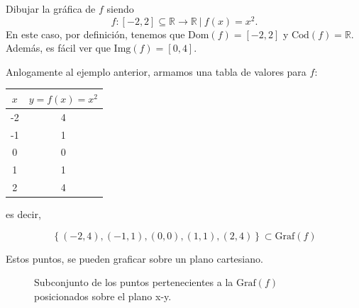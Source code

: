 \begin{example} Dibujar la gr\'afica de $f$ siendo $$f: [-2,2]  \subseteq \mathbb{R} \rightarrow  \mathbb{R} \:|\:  f(x)=x^2.$$    En este caso, por definici\'on,  tenemos que $\text{Dom}(f)=  [-2,2]$ y $\text{Cod}(f)=  \mathbb{R}$. Adem\'as, es f\'acil ver que $\text{Img}(f)= [0,4].$

Anlogamente al ejemplo anterior,  armamos una tabla de valores para $f$:
    \begin{table}[H]
        \centering
        \begin{tabular}{|c|c|}
            \hline
            $x$ & $y=f(x)=x^2$ \\ \hline
            -2  & 4        \\ \hline
            -1  & 1        \\ \hline
            0   & 0        \\ \hline
            1   & 1        \\ \hline
            2   & 4        \\ \hline
            \end{tabular}
      \end{table} es decir, 
     
    \begin{equation*}
        \left\{ (-2,4),(-1,1),(0,0),(1,1),(2,4) \right\}\subset \text{Graf}(f)
    \end{equation*}
 
 Estos puntos, se pueden graficar sobre un plano cartesiano.

\begin{figure}[H] 
        \begin{center}
        \end{center}
        \caption{Subconjunto de los puntos pertenecientes a la $\text{Graf}(f)$ posicionados sobre el plano x-y.}
\end{figure}


\end{example}
